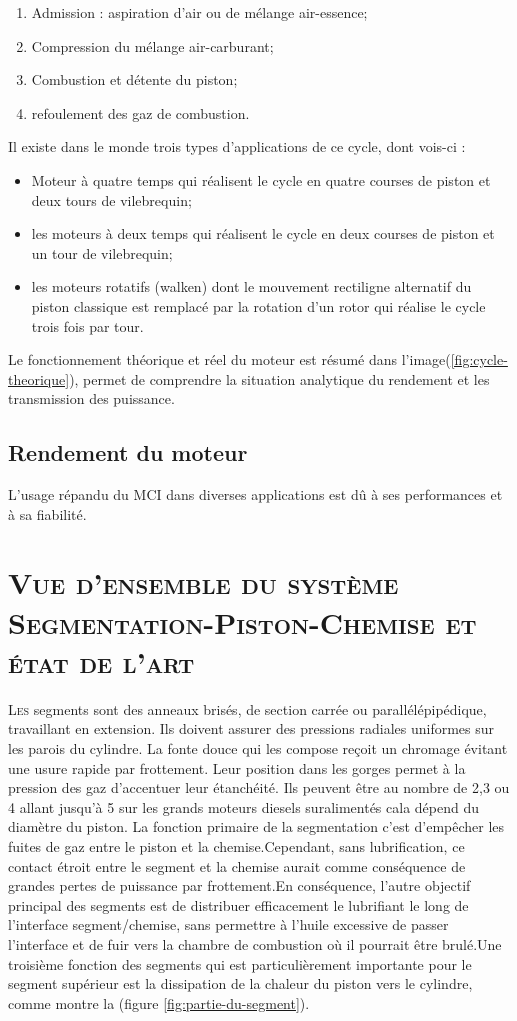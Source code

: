 \begin{enumerate}
	\item Admission : aspiration d'air ou de mélange air-essence; 
	\item Compression du mélange air-carburant;
	\item Combustion et détente du piston;
	\item refoulement des gaz de combustion.
\end{enumerate} 
Il existe dans le monde trois types d'applications de ce cycle, dont vois-ci :
\begin{itemize}
	\item Moteur à quatre temps qui réalisent le cycle en quatre courses de piston et deux tours de vilebrequin;
	\item les moteurs à deux temps qui réalisent le cycle en deux courses de piston et un tour de vilebrequin;
	\item les moteurs rotatifs (walken) dont le mouvement rectiligne alternatif du piston classique est remplacé par la rotation d'un rotor qui réalise le cycle trois fois par tour.
\end{itemize}
Le fonctionnement théorique et réel du moteur est résumé dans l'image(\ref{fig:cycle-theorique}), permet de comprendre la situation analytique du rendement et les transmission des puissance.
\subsection{Rendement du moteur}
L'usage répandu du MCI dans diverses applications est dû à ses performances et à sa fiabilité.

\section{\textsc{Vue d'ensemble du système Segmentation-Piston-Chemise et état de l'art} }

\lettrine{L}{es} segments sont des anneaux brisés, de section carrée ou parallélépipédique, travaillant en extension. Ils doivent assurer des pressions radiales uniformes sur les parois du cylindre. La fonte douce qui les compose reçoit un chromage évitant une usure rapide par frottement. Leur position dans les gorges permet à la pression des gaz d'accentuer leur étanchéité.\cite{tecauto} Ils peuvent être au nombre de 2,3 ou 4 allant jusqu'à 5 sur les grands moteurs diesels suralimentés cala dépend du diamètre du piston. La fonction primaire de la segmentation c'est d'empêcher les fuites de gaz entre le piston et la chemise.Cependant, sans lubrification, ce contact étroit entre le segment et la chemise aurait comme conséquence de grandes pertes de puissance par frottement.En conséquence, l'autre objectif principal des segments est de distribuer efficacement le lubrifiant le long de l'interface segment/chemise, sans permettre à l'huile excessive de passer l'interface et de fuir vers la chambre de combustion où il pourrait être brulé.Une troisième fonction des segments qui est particulièrement importante pour le segment supérieur est la dissipation de la chaleur du piston vers le cylindre, comme montre la (figure \ref{fig:partie-du-segment}).\\

